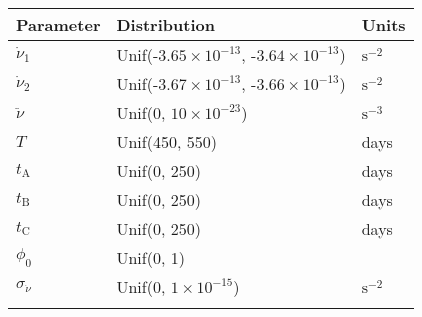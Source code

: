 \begin{tabular}{lll} \hhline{===}
        Parameter & Distribution &  Units\\ \hline
$\dot{\nu}_{1}$ & Unif(${\text{-}3.65}\times 10^{-13}$, ${\text{-}3.64}\times 10^{-13}$) & $\mathrm{s}^{-2}$\\
$\dot{\nu}_{2}$ & Unif(${\text{-}3.67}\times 10^{-13}$, ${\text{-}3.66}\times 10^{-13}$) & $\mathrm{s}^{-2}$\\
$\ddot{\nu}$ & Unif(0, ${10}\times 10^{-23}$) & $\mathrm{s}^{-3}$\\
$T$ & Unif(450, 550) & days\\
$t_\mathrm{A}$ & Unif(0, 250) & days\\
$t_\mathrm{B}$ & Unif(0, 250) & days\\
$t_\mathrm{C}$ & Unif(0, 250) & days\\
$\phi_{0}$ & Unif(0, 1) & \\
$\sigma_{\dot{\nu}}$ & Unif(0, ${1}\times 10^{-15}$) & $\mathrm{s}^{-2}$\\
\hhline{===}
\end{tabular}